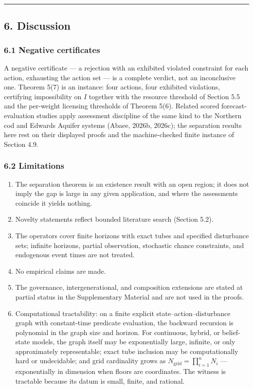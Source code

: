 \documentclass[11pt]{article}
\providecommand{\tightlist}{\setlength{\itemsep}{0pt}\setlength{\parskip}{0pt}}
\begin{document}
\begin{center}\rule{0.5\linewidth}{0.5pt}\end{center}

\subsection{6. Discussion}\label{discussion}

\subsubsection{6.1 Negative certificates}\label{negative-certificates}

A negative certificate --- a rejection with an exhibited violated constraint for each action, exhausting the action set --- is a complete verdict, not an inconclusive one. Theorem 5(7) is an instance: four actions, four exhibited violations, certifying impossibility on \(I\) together with the resource threshold of Section 5.5 and the per-weight licensing thresholds of Theorem 5(6). Related scored forecast-evaluation studies apply assessment discipline of the same kind to the Northern cod and Edwards Aquifer systems (Abaee, 2026b, 2026c); the separation results here rest on their displayed proofs and the machine-checked finite instance of Section 4.9.

\subsubsection{6.2 Limitations}\label{limitations}

\begin{enumerate}
\def\labelenumi{(\roman{enumi})}
\tightlist
\item
  The separation theorem is an existence result with an open region; it does not imply the gap is large in any given application, and where the assessments coincide it yields nothing.
\item
  Novelty statements reflect bounded literature search (Section 5.2).
\item
  The operators cover finite horizons with exact tubes and specified disturbance sets; infinite horizons, partial observation, stochastic chance constraints, and endogenous event times are not treated.
\item
  No empirical claims are made.
\item
  The governance, intergenerational, and composition extensions are stated at partial status in the Supplementary Material and are not used in the proofs.
\item
  Computational tractability: on a finite explicit state--action--disturbance graph with constant-time predicate evaluation, the backward recursion is polynomial in the graph size and horizon. For continuous, hybrid, or belief-state models, the graph itself may be exponentially large, infinite, or only approximately representable; exact tube inclusion may be computationally hard or undecidable; and grid cardinality grows as \(N_{\mathrm{grid}} = \prod_{i=1}^n N_i\) --- exponentially in dimension when floors are coordinates. The witness is tractable because its datum is small, finite, and rational.
\end{enumerate}
\end{document}
